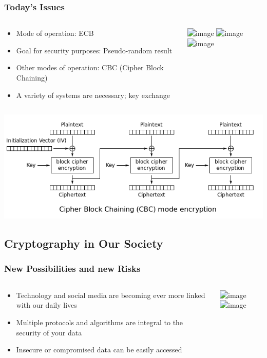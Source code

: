 \documentclass[12pt]{beamer}
\begin{document}
\begin{frame}
\frametitle{Today's Issues}

\begin{columns}
\begin{column}{0.5\textwidth}
\begin{itemize}
\item<1-> Mode of operation: ECB
\item<3-> Goal for security purposes: Pseudo-random result
\item<4-> Other modes of operation: CBC (Cipher Block Chaining)
\item<5-> A variety of systems are necessary; key exchange
\end{itemize}
\end{column}
\begin{column}{0.5\textwidth}
\includegraphics<1>[scale=0.7]{tux.jpg}
\includegraphics<2>[scale=0.7]{tux_ecb.jpg}
\includegraphics<3->[scale=0.7]{tux_secure.jpg}
\end{column}
\end{columns}
\end{frame}

\begin{frame}
\begin{center}
\includegraphics[scale=0.5]{CBC.PNG}
\end{center}
\end{frame}

\subsection{Cryptography in Our Society}

\begin{frame}
\frametitle{New Possibilities and new Risks}
\begin{columns}
\begin{column}{0.5\textwidth}
\begin{itemize}
\item<2-> Technology and social media are becoming ever more linked with our daily lives
\item<3-> Multiple protocols and algorithms are integral to the security of your data
\item<4-> Insecure or compromised data can be easily accessed
\end{itemize}
\end{column}
\begin{column}{0.5\textwidth}
\includegraphics<2->[scale=0.1]{SocialMedia.PNG} \break
\includegraphics<3->[scale=0.3]{https.PNG}
\end{column}
\end{columns}
\end{frame}
\end{document}
